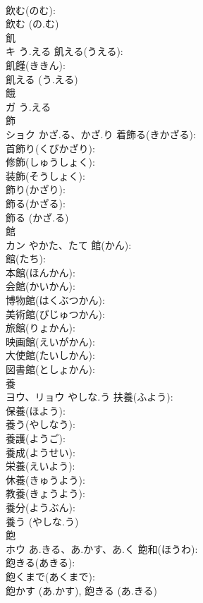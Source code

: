 \documentclass[8pt]{extreport}
\begin{document}
\begin{CJK}{UTF8}{min}
\\	飲む(のむ): 
\\	飲む (の.む)
\\	飢			
\\	キ	う.える	飢える(うえる): 
\\	飢饉(ききん): 
\\	飢える (う.える)
\\	餓			
\\	ガ	う.える		
\\	飾			
\\	ショク	かざ.る、かざ.り	着飾る(きかざる): 
\\	首飾り(くびかざり): 
\\	修飾(しゅうしょく): 
\\	装飾(そうしょく): 
\\	飾り(かざり): 
\\	飾る(かざる): 
\\	飾る (かざ.る)
\\	館			
\\	カン	やかた、たて	館(かん): 
\\	館(たち): 
\\	本館(ほんかん): 
\\	会館(かいかん): 
\\	博物館(はくぶつかん): 
\\	美術館(びじゅつかん): 
\\	旅館(りょかん): 
\\	映画館(えいがかん): 
\\	大使館(たいしかん): 
\\	図書館(としょかん): 
\\	養			
\\	ヨウ、リョウ	やしな.う	扶養(ふよう): 
\\	保養(ほよう): 
\\	養う(やしなう): 
\\	養護(ようご): 
\\	養成(ようせい): 
\\	栄養(えいよう): 
\\	休養(きゅうよう): 
\\	教養(きょうよう): 
\\	養分(ようぶん): 
\\	養う (やしな.う)
\\	飽			
\\	ホウ	あ.きる、あ.かす、あ.く	飽和(ほうわ): 
\\	飽きる(あきる): 
\\	飽くまで(あくまで): 
\\	飽かす (あ.かす), 飽きる (あ.きる)

\end{CJK}
\end{document}
